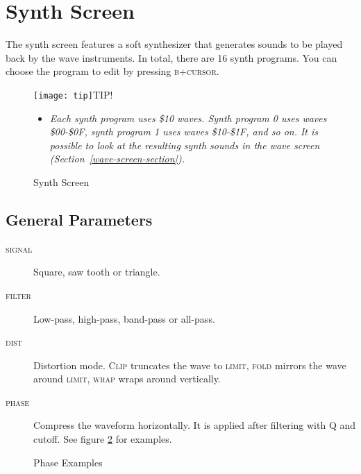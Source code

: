 \section{Synth Screen}

The synth screen features a soft synthesizer that generates sounds to be played back by the wave instruments. In total, there are 16 synth programs. You can choose the program to edit by pressing \textsc{b+cursor}.

\begin{figure}[h]
\texttt{[image: tip]}TIP!
\begin{itemize}
	\item \textit{Each synth program uses \$10 waves. Synth program 0 uses waves \$00-\$0F, synth program 1 uses waves \$10-\$1F, and so on. It is possible to look at the resulting synth sounds in the wave screen (Section~\ref{wave-screen-section}).}
\end{itemize}
\end{figure}

\begin{figure}[htbp]
	\begin{center}
	\end{center}
	\caption{Synth Screen}
	\label{fig:synth}
\end{figure}

\subsection{General Parameters}

\begin{description}
\item[\textsc{signal}] Square, saw tooth or triangle.
\item[\textsc{filter}] Low-pass, high-pass, band-pass or all-pass.
\item[\textsc{dist}] Distortion mode. \textsc{Clip} truncates the wave to \textsc{limit}, \textsc{fold} mirrors the wave around \textsc{limit}, \textsc{wrap} wraps around vertically.
\item[\textsc{phase}] \label{phase}
Compress the waveform horizontally. It is applied after filtering with Q and cutoff. See figure \ref{fig:phasing} for examples.
\end{description}

\begin{figure}[hbtp]
	\centering
	\qquad

	\qquad
	\caption{Phase Examples}
	\label{fig:phasing}
\end{figure}

